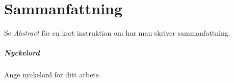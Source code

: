 \chapter*{Sammanfattning}
\begin{instructions}

Se \emph{Abstract} för en kort instruktion om hur man skriver sammanfattning.
\end{instructions}

\paragraph{Nyckelord}
\begin{instructions}
Ange nyckelord för ditt arbete.
\end{instructions}
